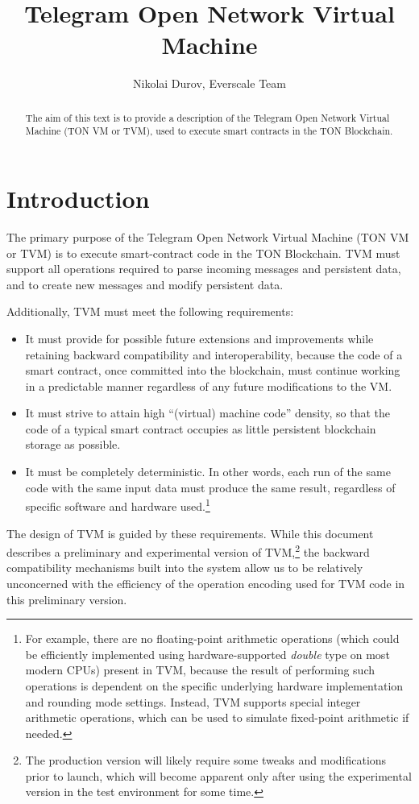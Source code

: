 \documentclass[12pt,oneside]{article}
\title{Telegram Open Network Virtual Machine}
\author{Nikolai Durov, Everscale Team}
\def\markbothsame#1{\fancyhead[C]{#1}}
\begin{document}
\maketitle

\begin{abstract}
  The aim of this text is to provide a description of the Telegram
  Open Network Virtual Machine (TON VM or TVM), used to execute smart
  contracts in the TON Blockchain.
\end{abstract}

\section*{Introduction}
\markbothsame{Introduction}

The primary purpose of the Telegram Open Network Virtual Machine (TON VM or TVM) is to execute smart-contract code in the TON Blockchain. TVM must support all operations required to parse incoming messages and persistent data, and to create new messages and modify persistent data.

Additionally, TVM must meet the following requirements:
\begin{itemize}
\item It must provide for possible future extensions and improvements while retaining backward compatibility and interoperability, because the code of a smart contract, once committed into the blockchain, must continue working in a predictable manner regardless of any future modifications to the VM.
\item It must strive to attain high ``(virtual) machine code'' density, so that the code of a typical smart contract occupies as little persistent block\-chain storage as possible.
\item It must be completely deterministic. In other words, each run of the same code with the same input data must produce the same result, regardless of specific software and hardware used.\footnote{For example, there are no floating-point arithmetic operations (which could be efficiently implemented using hardware-supported {\em double\/} type on most modern CPUs) present in TVM, because the result of performing such operations is dependent on the specific underlying hardware implementation and rounding mode settings. Instead, TVM supports special integer arithmetic operations, which can be used to simulate fixed-point arithmetic if needed.}
\end{itemize}
The design of TVM is guided by these requirements. While this document describes a preliminary and experimental version of TVM,\footnote{The production version will likely require some tweaks and modifications prior to launch, which will become apparent only after using the experimental version in the test environment for some time.} the backward compatibility mechanisms built into the system allow us to be relatively unconcerned with the efficiency of the operation encoding used for TVM code in this preliminary version.
\end{document}
